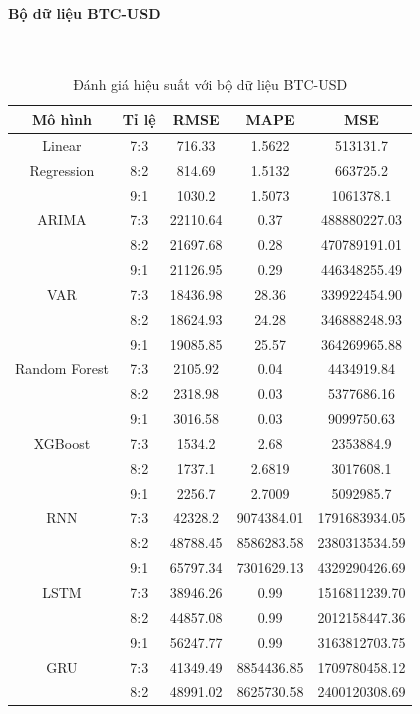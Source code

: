 \documentclass[conference]{IEEEtran}
\begin{document}
\paragraph{\textbf{Bộ dữ liệu BTC-USD}} \mbox{} \\
\begin{table}[H]
 \centering
 \caption{Đánh giá hiệu suất với bộ dữ liệu BTC-USD}
\begin{adjustbox}{width=0.4\textwidth}
\begin{tabular}{|c|c|c|c|c|}
\hline
Mô hình & Tỉ lệ & RMSE & MAPE & MSE \\ \hline
Linear & 7:3 & 716.33 & 1.5622 & 513131.7 \\
Regression & 8:2 & 814.69 & 1.5132 & 663725.2 \\
& 9:1 & 1030.2 & 1.5073 & 1061378.1 \\ \hline
ARIMA & 7:3 & 22110.64 & 0.37 & 488880227.03 \\
& 8:2 & 21697.68 & 0.28 & 470789191.01 \\
& 9:1 & 21126.95 & 0.29 & 446348255.49 \\ \hline
VAR & 7:3 & 18436.98 & 28.36 & 339922454.90 \\
& 8:2 & 18624.93 & 24.28 & 346888248.93 \\
& 9:1 & 19085.85 & 25.57 & 364269965.88 \\ \hline
Random Forest & 7:3 & 2105.92 & 0.04 & 4434919.84 \\
& 8:2 & 2318.98 & 0.03 & 5377686.16 \\
& 9:1 & 3016.58 & 0.03 & 9099750.63 \\ \hline
XGBoost & 7:3 & 1534.2 & 2.68 & 2353884.9 \\
& 8:2 & 1737.1 & 2.6819 & 3017608.1 \\
& 9:1 & 2256.7 & 2.7009 & 5092985.7 \\ \hline
RNN & 7:3 & 42328.2 & 9074384.01 & 1791683934.05 \\
& 8:2 & 48788.45 & 8586283.58 & 2380313534.59 \\
& 9:1 & 65797.34 & 7301629.13 & 4329290426.69 \\ \hline
LSTM & 7:3 & 38946.26 & 0.99 & 1516811239.70 \\
& 8:2 & 44857.08 & 0.99 & 2012158447.36 \\
& 9:1 & 56247.77 & 0.99 & 3163812703.75 \\ \hline
GRU & 7:3 & 41349.49 & 8854436.85 & 1709780458.12 \\
& 8:2 & 48991.02 & 8625730.58 & 2400120308.69 \\

\end{tabular}
\end{adjustbox}
\end{table}
\end{document}
